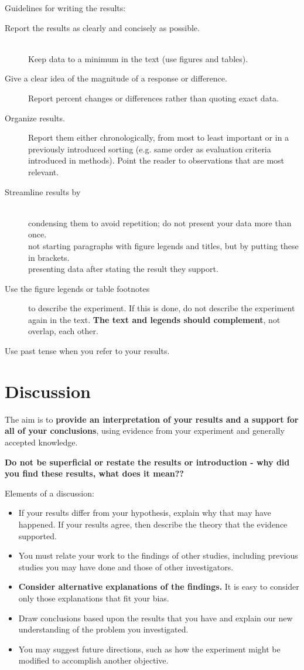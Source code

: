 Guidelines for writing the results:
\begin{description}
	\item[Report the results as clearly and concisely as possible.] \hfill \\
		 	Keep data to a minimum in the text (use figures and tables).
	\item[Give a clear idea of the magnitude of a response or difference.]
		Report percent changes or differences rather than quoting exact data.
	\item[Organize results.] Report them either chronologically, from most to least important or in a previously introduced sorting (e.g. same order as evaluation criteria introduced in methods). Point the reader to observations that are most relevant.
	\item[Streamline results by] \hfill \\
		condensing them to avoid repetition; do not present your data more than once.\hfill \\
		not starting paragraphs with figure legends and titles, but by putting these in brackets.\hfill \\
		presenting data after stating the result they support.
	\item[Use the figure legends or table footnotes] to describe the experiment. If this is done, do not describe the experiment again in the text. \textbf{The text and legends should complement}, not overlap, each other.
	\item[Use past tense when you refer to your results.]
\end{description}

\section{Discussion}\label{AboutDiscussion}

The aim is to \textbf{provide an interpretation of your results and a support for all of your conclusions}, using evidence from your experiment and generally accepted knowledge.

 \textbf{Do not be superficial or restate the results or introduction - why did you find these results, what does it mean??}

Elements of a discussion:
\begin{itemize}
	\item If your results differ from your hypothesis, explain why that may have happened. If your results agree, then describe the theory that the evidence supported.
	\item You must relate your work to the findings of other studies, including previous studies you may have done and those of other investigators.
	\item \textbf{Consider alternative explanations of the findings.} It is easy to consider only those explanations that fit your bias.
	\item Draw conclusions based upon the results that you have and explain our new understanding of the problem you investigated.
	\item You may suggest future directions, such as how the experiment might be modified to accomplish another objective.
\end{itemize}

